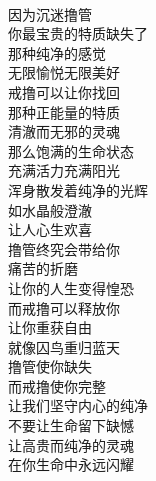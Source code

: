\begin{poem}[戒撸使你完整]
    \begin{multicols}{3}
        \centering~\\
        因为沉迷撸管 \\ 你最宝贵的特质缺失了 \\ 那种纯净的感觉 \\ 无限愉悦无限美好 \\ 戒撸可以让你找回 \\ 那种正能量的特质 \\ 清澈而无邪的灵魂 \\ 那么饱满的生命状态 \\ 充满活力充满阳光 \\ 浑身散发着纯净的光辉 \\ 如水晶般澄澈 \\ 让人心生欢喜 \\ 撸管终究会带给你 \\ 痛苦的折磨 \\ 让你的人生变得惶恐 \\ 而戒撸可以释放你 \\ 让你重获自由 \\ 就像囚鸟重归蓝天 \\ 撸管使你缺失 \\ 而戒撸使你完整 \\ 让我们坚守内心的纯净 \\ 不要让生命留下缺憾 \\ 让高贵而纯净的灵魂 \\ 在你生命中永远闪耀
    \end{multicols}
\end{poem}

